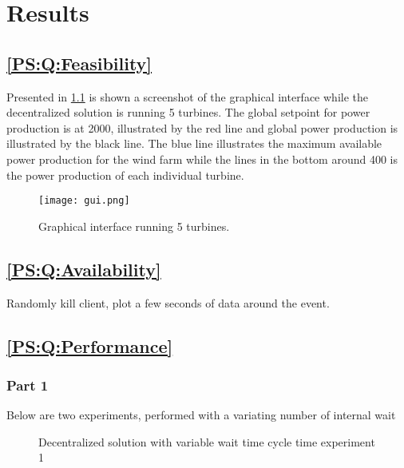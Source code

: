 
\chapter{Results}

\section{\ref{PS:Q:Feasibility}}
Presented in \cref{fig:graphicalInterface} is shown a screenshot of the graphical interface while the decentralized solution is running 5 turbines.
The global setpoint for power production is at 2000, illustrated by the red line and global power production is illustrated by the black line.
The blue line illustrates the maximum available power production for the wind farm while the lines in the bottom around 400 is the power production of each individual turbine.

\begin{figure} [!h]
	\centering
	\texttt{[image: gui.png]} 
	\caption[Graphical interface running 5 turbines]{
		\label{fig:graphicalInterface} 
		\footnotesize{%
			Graphical interface running 5 turbines.
		}
	}
\end{figure}


\section{\ref{PS:Q:Availability}}
Randomly kill client, plot a few seconds of data around the event.

\section{\ref{PS:Q:Performance}}

\subsection{Part 1}

Below are two  experiments, performed with a variating number of internal wait

\begin{figure}[h]
	
	\caption{Decentralized solution with variable wait time cycle time experiment 1}
	\label{fig:exp:decen:sleep}
\end{figure}

